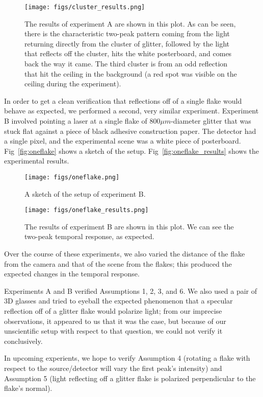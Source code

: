 \documentclass[11pt]{article}
\begin{document}
\begin{figure}
\begin{center}
\texttt{[image: figs/cluster\_results.png]} 
\caption{The results of experiment A are shown in this plot. As can be seen, there is the characteristic two-peak pattern coming from the light returning directly from the cluster of glitter, followed by the light that reflects off the cluster, hits the white posterboard, and comes back the way it came. The third cluster is from an odd reflection that hit the ceiling in the background (a red spot was visible on the ceiling during the experiment). \label{fig:cluster}}
\end{center}
\end{figure}

In order to get a clean verification that reflections off of a single flake would behave as expected, we performed a second, very similar experiment. Experiment B involved pointing a laser at a single flake of 800$\mu m$-diameter glitter that was stuck flat against a piece of black adhesive construction paper. The detector had a single pixel, and the experimental scene was a white piece of posterboard. Fig~\ref{fig:oneflake} shows a sketch of the setup. Fig~\ref{fig:oneflake_results} shows the experimental results.

\begin{figure}
\begin{center}
\texttt{[image: figs/oneflake.png]} 
\caption{A sketch of the setup of experiment B. \label{fig:cluster}}
\end{center}
\end{figure}

\begin{figure}
\begin{center}
\texttt{[image: figs/oneflake\_results.png]} 
\caption{The results of experiment B are shown in this plot. We can see the two-peak temporal response, as expected. \label{fig:cluster}}
\end{center}
\end{figure}

Over the course of these experiments, we also varied the distance of the flake from the camera and that of the scene from the flakes; this produced the expected changes in the temporal response. 

Experiments A and B verified Assumptions 1, 2, 3, and 6. We also used a pair of 3D glasses and tried to eyeball the expected phenomenon that a specular reflection off of a glitter flake would polarize light; from our imprecise observations, it appeared to us that it was the case, but because of our unscientific setup with respect to that question, we could not verify it conclusively. 

In upcoming experients, we hope to verify Assumption 4 (rotating a flake with respect to the source/detector will vary the first peak's intensity) and Assumption 5 (light reflecting off a glitter flake is polarized perpendicular to the flake's normal).
\end{document}
